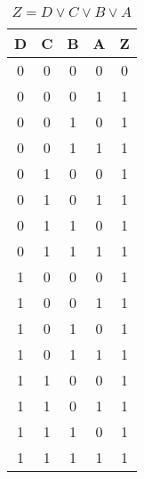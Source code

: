 \begin{center}
    \begin{table}[h] \caption{\(Z = D \lor C \lor B \lor A \)}
        \begin{center}
            \begin{tabular}{|c|c|c|c||c|} \hline
            D & C & B & A & Z \\ \hline\hline
            0 & 0 & 0 & 0 & 0 \\ \hline
            0 & 0 & 0 & 1 & 1 \\ \hline
            0 & 0 & 1 & 0 & 1 \\ \hline
            0 & 0 & 1 & 1 & 1 \\ \hline
            0 & 1 & 0 & 0 & 1 \\ \hline
            0 & 1 & 0 & 1 & 1 \\ \hline
            0 & 1 & 1 & 0 & 1 \\ \hline
            0 & 1 & 1 & 1 & 1 \\ \hline
            1 & 0 & 0 & 0 & 1 \\ \hline
            1 & 0 & 0 & 1 & 1 \\ \hline
            1 & 0 & 1 & 0 & 1 \\ \hline
            1 & 0 & 1 & 1 & 1 \\ \hline
            1 & 1 & 0 & 0 & 1 \\ \hline
            1 & 1 & 0 & 1 & 1 \\ \hline
            1 & 1 & 1 & 0 & 1 \\ \hline
            1 & 1 & 1 & 1 & 1 \\ \hline
            \end{tabular}
        \end{center}
    \end{table}
\end{center}
